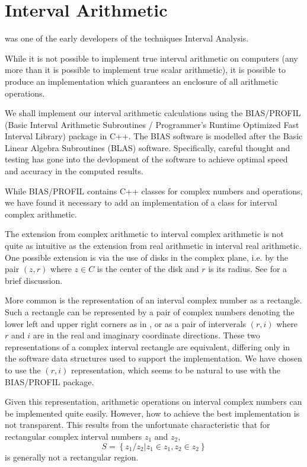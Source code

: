\documentclass{report}
\begin{document}
\author{Kevin Wright}

\section{Interval Arithmetic}

\cite{Moo66} was one of the early developers of the techniques Interval
Analysis.   

While it is not possible to implement true interval arithmetic on computers
(any more than it is possible to implement true scalar arithmetic), it is
possible to produce an implementation which guarantees an enclosure of all 
arithmetic operations.

We shall implement our interval arithmetic calculations using the BIAS/PROFIL
(Basic Interval Arithmetic Subroutines / Programmer's Runtime Optimized Fast
Interval Library)
package \cite{Knu93a, Knu93b} in C++.   The BIAS software is 
modelled after the
Basic Linear Algebra Subroutines (BLAS) software.  Specifically, careful
thought and testing has gone into the devlopment of the software to achieve
optimal speed and accuracy in the computed results.

While BIAS/PROFIL contains C++ classes for complex numbers and operations, we
have found it necessary to add an implementation of a class for interval
complex arithmetic.

The extension from complex arithmetic to interval complex arithmetic is not
quite as intuitive as the extension from real arithmetic in interval real
arithmetic.  One possible extension is via the use of disks in the 
complex plane, i.e. by the pair $(z,r)$ where $z \in C$ is the
center of the disk and $r$ is its radius.
See \cite{Nickel80} for a brief discussion.

More common is the representation
of an interval complex number as a rectangle.  Such a rectangle can be
represented by a pair of complex numbers denoting the lower left and upper
right corners as in \cite{RL71}, 
or as a pair of interverals $(r,i)$ where $r$ and $i$ are in the
real and imaginary coordinate directions.  These two representations of a
complex interval rectangle are equivalent, differing only in the 
software data structures used to support the implementation.  
We have chosen to use the $(r,i)$ representation, which seems to be natural to
use with the BIAS/PROFIL package.

Given this representation, arithmetic operations on interval complex numbers
can be implemented quite easily.  However, how to achieve
 the best implementation is not transparent.  This results from the
unfortunate characteristic that for rectangular complex interval numbers
$z_1$ and $z_2$, 
$$
S = \left\{ z_1 / z_2 | z_1 \in z_1, z_2 \in z_2 \right\}
$$
is generally not a rectangular region.
\end{document}
